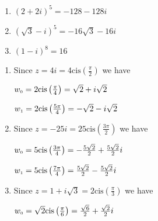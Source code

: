 \documentclass{ximera}
\begin{document}
\begin{multicols}{3}

\begin{enumerate}

\setcounter{enumi}{\value{HW}}

\item $(2+2i)^5 = -128-128i$
\item $(\sqrt{3} - i)^{5} =  -16\sqrt{3} - 16i$
\item  $(1-i)^8=16$

\setcounter{HW}{\value{enumi}}

\end{enumerate}

\end{multicols}

\begin{enumerate}

\setcounter{enumi}{\value{HW}}

\item Since $z=4i = 4\text{cis}\left(\frac{\pi}{2}\right)$ we have 

\begin{multicols}{2}

$w_{\text{\tiny$0$}} = 2\text{cis}\left(\frac{\pi}{4}\right) = \sqrt{2} +i\sqrt{2}$

$w_{\text{\tiny$1$}} = 2\text{cis}\left(\frac{5\pi}{4}\right) = -\sqrt{2} - i\sqrt{2}$

\end{multicols}

\item Since $z=-25i = 25\text{cis}\left(\frac{3\pi}{2}\right)$ we have 

\begin{multicols}{2}

$w_{\text{\tiny$0$}} = 5\text{cis}\left(\frac{3\pi}{4}\right) = -\frac{5\sqrt{2}}{2} +\frac{5\sqrt{2}}{2} i$

$w_{\text{\tiny$1$}} = 5\text{cis}\left(\frac{7\pi}{4}\right) = \frac{5\sqrt{2}}{2} - \frac{5\sqrt{2}}{2} i$

\end{multicols}

\item Since $z=1 + i\sqrt{3} = 2\text{cis}\left(\frac{\pi}{3}\right)$ we have 

\begin{multicols}{2}

$w_{\text{\tiny$0$}} = \sqrt{2}\text{cis}\left(\frac{\pi}{6}\right) = \frac{\sqrt{6}}{2} +\frac{\sqrt{2}}{2} i$


\end{multicols}
\end{enumerate}
\end{document}

